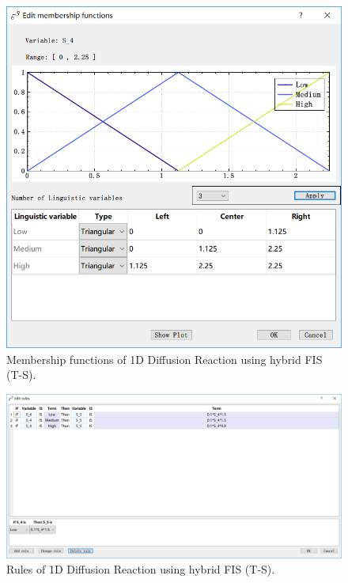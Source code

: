 \documentclass[journal,a4paper,onecolumn]{article}
\begin{document}
\begin{figure}[!hbt]
	\begin{center}
		\includegraphics[width=0.9\columnwidth]{fig39}
		\caption{Membership functions of 1D Diffusion Reaction using hybrid FIS (T-S).}
		\label{fig:Membership functions of 1D Diffusion Reaction using hybrid FIS (T-S).}
	\end{center}
\end{figure}

\begin{figure}[!hbt]
	\begin{center}
		\includegraphics[width=\columnwidth]{fig40}
		\caption{Rules of 1D Diffusion Reaction using hybrid FIS (T-S).}
		\label{fig:Rules of 1D Diffusion Reaction using hybrid FIS (T-S).}
	\end{center}
\end{figure}
\end{document}
